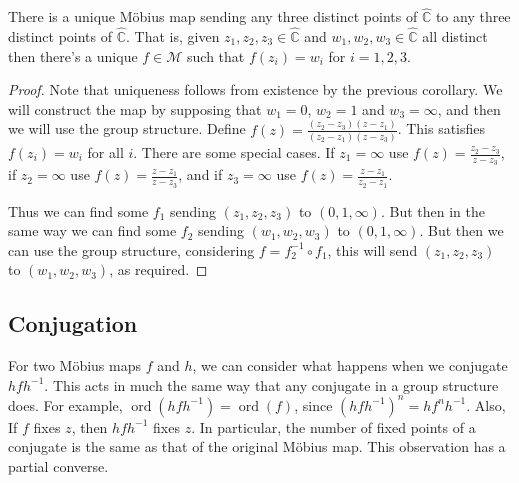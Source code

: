 \documentclass[a4paper]{scrartcl}
\begin{document}
\begin{theorem}
	There is a unique Möbius map sending any three distinct points of $\hat{\mathbb{C}}$ to any three distinct points of $\hat{\mathbb{C}}$. That is, given $z_1, z_2, z_3 \in \hat{\mathbb{C}}$ and $w_1, w_2, w_3 \in \hat{\mathbb{C}}$ all distinct then there's a unique $f \in \mathcal{M}$ such that $f(z_i) = w_i$ for $i = 1, 2, 3$. 
\end{theorem}
\begin{proof}
	Note that uniqueness follows from existence by the previous corollary. We will construct the map by supposing that $w_1 = 0$, $w_2 = 1$ and $w_3 = \infty$, and then we will use the group structure.
	Define $f(z) = \frac{(z_2 - z_3)(z - z_1)}{(z_2 - z_1)(z - z_3)}$. This satisfies $f(z_i) = w_i$ for all $i$. There are some special cases. If $z_1 = \infty$ use $f(z) = \frac{z_2 - z_3}{z - z_3}$, if $z_2 = \infty$ use $f(z) = \frac{z - z_1}{z - z_3}$, and if $z_3 = \infty$ use $f(z) = \frac{z - z_1}{z_2 - z_1}$.

	Thus we can find some $f_1$ sending $(z_1, z_2, z_3)$ to $(0, 1, \infty)$. But then in the same way we can find some $f_2$ sending $(w_1, w_2, w_3)$ to $(0, 1, \infty)$. But then we can use the group structure, considering $f = f_2^{-1} \circ f_1$, this will send $(z_1, z_2, z_3)$ to $(w_1, w_2, w_3)$, as required.
\end{proof}

\subsection{Conjugation}

For two Möbius maps $f$ and $h$, we can consider what happens when we conjugate $h fh^{-1}$. This acts in much the same way that any conjugate in a group structure does. For example, $\operatorname{ord}(hfh^{-1}) = \operatorname{ord}(f)$, since $(hfh^{-1})^{n} = hf^{n} h^{-1}$. Also, If $f$ fixes $z$, then $h fh^{-1}$ fixes $z$. In particular, the number of fixed points of a conjugate is the same as that of the original Möbius map. This observation has a partial converse.
\end{document}
